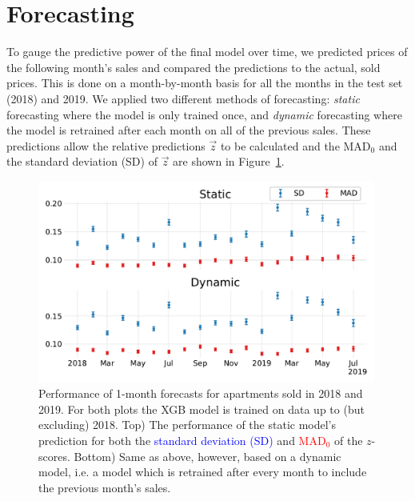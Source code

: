 \section{Forecasting}
\label{sec:h:forecasting}

To gauge the predictive power of the final model over time, we predicted prices of the following month's sales and compared the predictions to the actual, sold prices. This is done on a month-by-month basis for all the months in the test set (\num{2018}) and \num{2019}. 
We applied two different methods of forecasting: \emph{static} forecasting where the model is only trained once, and \emph{dynamic} forecasting where the model is retrained after each month on all of the previous sales. These predictions allow the relative predictions $\vec{z}$ to be calculated and the $\mathrm{MAD}_0$ and the standard deviation (SD) of $\vec{z}$ are shown in Figure~\ref{fig:h:forecast_MAD_SD}. 
\begin{figure}
  \centerfloat
  \includegraphics[width=0.99\textwidth, trim=10 15 10 10, clip]{figures/housing/Ejerlejlighed_v19_cut_all_Ncols_all_xgb_forecast_prediction_MAD.pdf}
  \caption[Standard Deviation and MAD of the Static and Dynamic XGB Forecasts]
          {Performance of 1-month forecasts for apartments sold in \num{2018} and \num{2019}. For both plots the XGB model is trained on data up to (but excluding) 2018. Top) The performance of the static model's prediction for both the \textcolor{blue}{standard deviation (SD)} and \textcolor{red}{$\mathrm{MAD}_0$} of the $z$-scores. Bottom) Same as above, however, based on a dynamic model, i.e. a model which is retrained after every month to include the previous month's sales.} 
  \label{fig:h:forecast_MAD_SD}
\end{figure}


